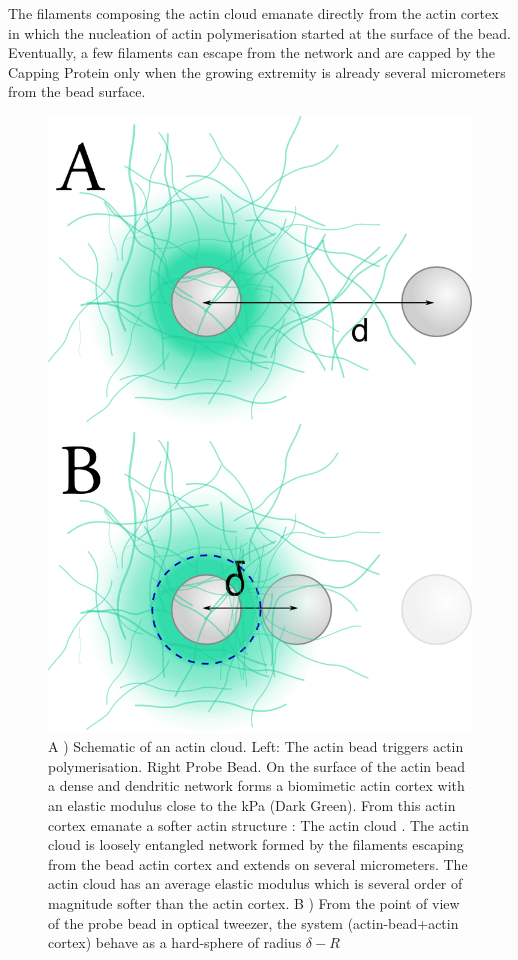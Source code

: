 \documentclass[A4paperpaper,11pt,english]{sphinxmanual}
\begin{document}
The filaments composing the actin cloud emanate directly from the actin
cortex in which the nucleation of actin polymerisation started at the surface
of the bead. Eventually, a few filaments can escape from the network and are
capped by the Capping Protein only when the growing extremity is already several
micrometers from the bead surface.
\begin{figure}[htbp]
\centering
\capstart

\includegraphics[width=0.600\linewidth]{interp-delta.png}
\caption{A ) Schematic of an actin cloud. Left:  The actin bead triggers actin
polymerisation. Right Probe Bead. On the surface of the actin bead a dense
and dendritic network forms a biomimetic actin cortex with an elastic
modulus close to the kPa (Dark Green). From this actin cortex emanate a
softer actin structure : The actin cloud . The actin cloud is  loosely
entangled network formed by the filaments escaping from the bead actin
cortex and extends on several micrometers. The actin cloud has an average
elastic modulus which is several order of magnitude softer than the actin
cortex. B ) From the point of view of the probe bead in optical tweezer, the
system (actin-bead+actin cortex) behave as a hard-sphere of radius
\(\delta-R\)}\label{parts/part3:fig-interpretation}\end{figure}
\end{document}
